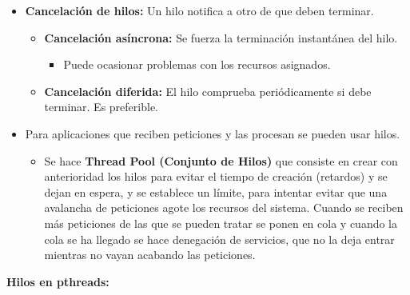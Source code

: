 \documentclass[12pt, twoside, openright]{report} %
\begin{document}
  \begin{itemize}
  \item \textbf{Cancelación de hilos:} Un hilo notifica a otro de que deben
    terminar.
    

    \begin{itemize}
    \item \textbf{Cancelación asíncrona:} Se fuerza la terminación
      instantánea del hilo.
      

      \begin{itemize}
      \item Puede ocasionar problemas con los recursos asignados.
        
      \end{itemize}
    \item \textbf{Cancelación diferida:} El hilo comprueba periódicamente si
      debe terminar. Es preferible.
      
    \end{itemize}
  \item Para aplicaciones que reciben peticiones y las procesan se pueden
    usar hilos.
    

    \begin{itemize}
    \item Se hace \textbf{Thread Pool (Conjunto de Hilos)} que consiste en
      crear con anterioridad los hilos para evitar el tiempo de creación
      (retardos) y se dejan en espera, y se establece un límite, para
      intentar evitar que una avalancha de peticiones agote los recursos
      del sistema. Cuando se reciben más peticiones de las que se pueden
      tratar se ponen en cola y cuando la cola se ha llegado se hace
      denegación de servicios, que no la deja entrar mientras no vayan
      acabando las peticiones.
      
    \end{itemize}
  \end{itemize}
\textbf{Hilos en pthreads:}
  
\end{document}

